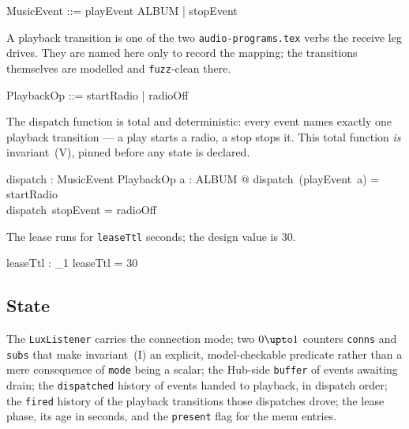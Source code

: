 \documentclass[a4paper,10pt,fleqn]{article}
\begin{document}
\begin{zed}
  MusicEvent ::= playEvent \ldata ALBUM \rdata | stopEvent
\end{zed}

A playback transition is one of the two \texttt{audio-programs.tex} verbs the
receive leg drives. They are named here only to record the mapping; the
transitions themselves are modelled and \texttt{fuzz}-clean there.

\begin{zed}
  PlaybackOp ::= startRadio | radioOff
\end{zed}

The dispatch function is total and deterministic: every event names exactly one
playback transition --- a play starts a radio, a stop stops it. This total
function \emph{is} invariant~(V), pinned before any state is declared.

\begin{axdef}
  dispatch : MusicEvent \fun PlaybackOp
  \where
  \forall a : ALBUM @ dispatch~(playEvent~a) = startRadio \\
  dispatch~stopEvent = radioOff
\end{axdef}

The lease runs for \texttt{leaseTtl} seconds; the design value is $30$.

\begin{axdef}
  leaseTtl : \nat_1
  \where
  leaseTtl = 30
\end{axdef}

\subsection{State}

The \texttt{LuxListener} carries the connection mode; two $0 \upto 1$ counters
\texttt{conns} and \texttt{subs} that make invariant~(I) an explicit,
model-checkable predicate rather than a mere consequence of \texttt{mode} being a
scalar; the Hub-side \texttt{buffer} of events awaiting drain; the
\texttt{dispatched} history of events handed to playback, in dispatch order; the
\texttt{fired} history of the playback transitions those dispatches drove; the
lease phase, its age in seconds, and the \texttt{present} flag for the menu
entries.
\end{document}
